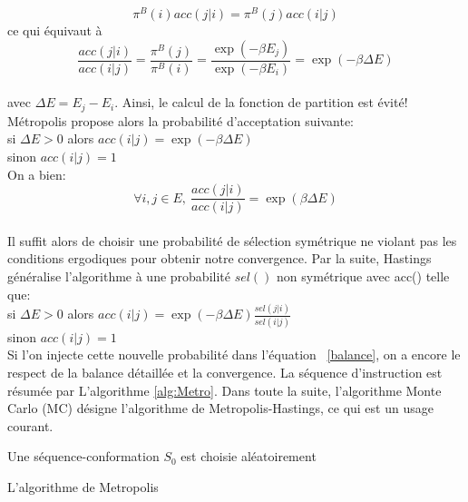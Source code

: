 \begin{equation}
    \label{bd_Metropolis}
\pi^B(i)acc(j|i) = \pi^B(j)acc(i|j) 
\end{equation}
ce qui équivaut à
\begin{equation}
\frac{acc(j|i)}{acc(i|j)} =\frac{\pi^B(j)}{\pi^B(i)} = \frac{\exp(-\beta E_j)}{\exp(-\beta E_i)} = \exp(-\beta \Delta E) 
\end{equation}\\
avec $\Delta E =  E_j - E_i$. Ainsi, le calcul de la fonction de partition est évité! Métropolis propose alors la probabilité d'acceptation suivante:\\
si $\Delta E >0$ alors $acc(i|j) = \exp(- \beta \Delta E)$ \\
sinon
$acc(i|j)=1$\\
On a bien: 
\begin{equation}
\forall i,j \in E,\ \frac{acc(j|i)}{acc(i|j)} = \exp(\beta \Delta E)
\end{equation}\\
Il suffit alors de choisir une probabilité de sélection symétrique ne violant pas les conditions ergodiques pour obtenir notre convergence. Par la suite, Hastings généralise l'algorithme à une probabilité $sel()$ non symétrique avec acc() telle que:\\
si $\Delta E >0$ alors $acc(i|j) = \exp(- \beta \Delta E) \frac{sel(j|i)}{sel(i|j)}$ \label{eq:Hasting}\\
sinon $acc(i|j)=1$\\
Si l'on injecte cette nouvelle probabilité dans l'équation ~\ref{balance}, on a encore le respect de la balance détaillée et la convergence. La séquence d'instruction est résumée par L'algorithme \ref{alg:Metro}. Dans toute la suite, l'algorithme Monte Carlo (MC) désigne l'algorithme de Metropolis-Hastings, ce qui est un usage courant.


\begin{algorithm}
  Une séquence-conformation $S_0$ est choisie aléatoirement\;
\caption{L'algorithme de Metropolis} \label{alg:Metro}
\end{algorithm}


